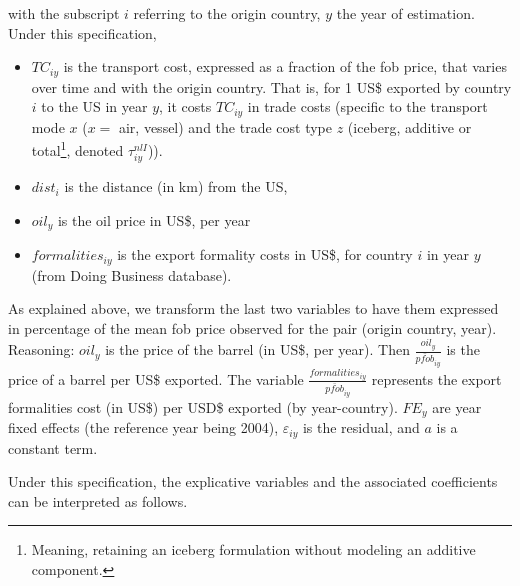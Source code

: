 \documentclass[a4paper,11pt]{article}
\begin{document}
with the subscript $i$ referring to the origin country, $y$ the year of estimation. Under this specification,
\begin{itemize}
\item $TC_{iy}$ is the transport cost, expressed as a fraction of the fob price, that varies over time and with the origin country. That is, for 1 US\$ exported by country $i$ to the US in year $y$, it costs $TC_{iy}$ in trade costs (specific to the transport mode $x$ ($x=$ air, vessel) and the trade cost type $z$ (iceberg, additive or total\footnote{Meaning, retaining an iceberg formulation without modeling an additive component.}, denoted $\tau_{iy}^{nlI}$)).
\item $dist_i$ is the distance (in km) from the US,
\item $oil_{y}$ is the oil price in US\$, per year
\item $formalities_{iy}$ is the export formality costs in US\$, for country $i$ in year $y$ (from Doing Business database).
\end{itemize}
As explained above, we transform the last two variables to have them expressed in percentage of the mean fob price observed for the pair (origin country, year). Reasoning: $oil_{y}$ is the price of the barrel (in US\$, per year). Then $\frac{oil_{y}}{\bar{pfob}_{iy}}$ is the price of a barrel per US\$ exported. The variable $\frac{formalities_{iy}}{\bar{pfob}_{iy}}$ represents the export formalities cost (in US\$) per USD\$ exported (by year-country). $FE_y$ are year fixed effects (the reference year being 2004), $\varepsilon_{iy}$ is the residual, and $a$ is a constant term.\smallskip

Under this specification, the explicative variables and the associated coefficients can be interpreted as follows.
\end{document}
